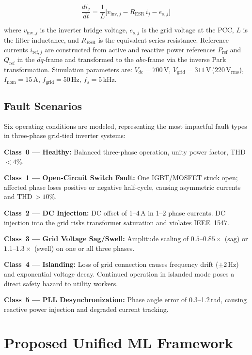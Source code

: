 \documentclass[conference]{IEEEtran}
\begin{document}
\begin{equation}
  \frac{di_j}{dt} = \frac{1}{L}\bigl[v_{\mathrm{inv},j}
    - R_{\mathrm{ESR}}\,i_j - e_{o,j}\bigr]
  \label{eq:filter}
\end{equation}

\noindent where $v_{\mathrm{inv},j}$ is the inverter bridge voltage,
$e_{o,j}$ is the grid voltage at the PCC, $L$ is the filter inductance, and
$R_{\mathrm{ESR}}$ is the equivalent series resistance. Reference currents
$i_{\mathrm{ref},j}$ are constructed from active and reactive power references
$P_{\mathrm{ref}}$ and $Q_{\mathrm{ref}}$ in the $dq$-frame and transformed
to the $abc$-frame via the inverse Park transformation. Simulation parameters
are: $V_{dc} = 700$\,V, $V_{\mathrm{grid}} = 311$\,V\,(220\,V$_{\mathrm{rms}}$),
$I_{\mathrm{nom}} = 15$\,A, $f_{\mathrm{grid}} = 50$\,Hz,
$f_s = 5$\,kHz.

\subsection{Fault Scenarios}

Six operating conditions are modeled, representing the most impactful fault
types in three-phase grid-tied inverter systems:

\textbf{Class~0 --- Healthy:} Balanced three-phase operation, unity power
factor, THD\,$< 4\%$.

\textbf{Class~1 --- Open-Circuit Switch Fault:} One IGBT/MOSFET stuck open;
affected phase loses positive or negative half-cycle, causing asymmetric
currents and THD\,$> 10\%$.

\textbf{Class~2 --- DC Injection:} DC offset of 1--4\,A in 1--2 phase
currents. DC injection into the grid risks transformer saturation and violates
IEEE~1547.

\textbf{Class~3 --- Grid Voltage Sag/Swell:} Amplitude scaling of
$0.5$--$0.85\times$ (sag) or $1.1$--$1.3\times$ (swell) on one or all three
phases.

\textbf{Class~4 --- Islanding:} Loss of grid connection causes frequency
drift ($\pm 2$\,Hz) and exponential voltage decay. Continued operation in
islanded mode poses a direct safety hazard to utility workers.

\textbf{Class~5 --- PLL Desynchronization:} Phase angle error of
0.3--1.2\,rad, causing reactive power injection and degraded current
tracking.

\section{Proposed Unified ML Framework}
\end{document}
